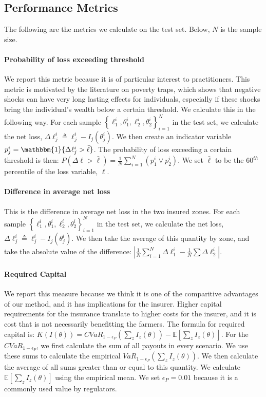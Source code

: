 \documentclass[11pt]{article}
\begin{document}
  \subsection{Performance Metrics}
    The following are the metrics we calculate on the test set. Below, $N$ is the sample size. 

    \paragraph*{Probability of loss exceeding threshold} We report this metric because it is of particular interest to practitioners. This metric is motivated by the literature on poverty traps, which shows that negative shocks can have very long lasting effects for individuals, especially if these shocks bring the individual's wealth below a certain threshold. We calculate this in the following way. For each sample $\left \{\ell^i_1,\theta^i_1, \ell^i_2, \theta^i_2 \right \}_{i=1}^N$ in the test set, we calculate the net loss, $\Delta \ell_j^i \triangleq  \ell^i_j - I_j(\theta^i_j)$. We then create an indicator variable $p^i_j =  \mathbbm{1}\{ \Delta \ell^i_j > \bar{\ell} \}$. The probability of loss exceeding a certain threshold is then: $P(\Delta \ell > \bar{\ell}) = \frac{1}{N}\sum_{i=1}^N (p^i_1 \lor p^i_2)$. We set $\bar{\ell}$ to be the $60^{th}$ percentile of the loss variable, $\ell$.
    
    \paragraph*{Difference in average net loss} This is the difference in average net loss in the two insured zones. For each sample $\left \{\ell^i_1,\theta^i_1, \ell^i_2, \theta^i_2 \right \}_{i=1}^N$ in the test set, we calculate the net loss, $\Delta \ell^i_j \triangleq  \ell^i_j - I_j(\theta^i_j)$. We then take the average of this quantity by zone, and take the absolute value of the difference: $|\frac{1}{N}\sum_{i=1}^N \Delta \ell^i_1 - \frac{1}{N}\sum \Delta \ell^i_2|$.

    \paragraph*{Required Capital} We report this measure because we think it is one of the comparitive advantages of our method, and it has implications for the insurer. Higher capital requirements for the insurance translate to higher costs for the insurer, and it is cost that is not necessarily benefitting the farmers. The formula for required capital is: $K(I(\theta)) = CVaR_{1-\epsilon_P}(\sum_z I_z(\theta)) - \mathbb{E}[\sum_z I_z(\theta)]$. For the $CVaR_{1-\epsilon_P}$, we first calculate the sum of all payouts in every scenario. We use these sums to calculate the empirical $VaR_{1-\epsilon_P}(\sum_z I_z(\theta))$. We then calculate the average of all sums greater than or equal to this quantity. We calculate $\mathbb{E}[\sum_z I_z(\theta)]$ using the empirical mean. We set $\epsilon_P = 0.01$ because it is a commonly used value by regulators. 
\end{document}
